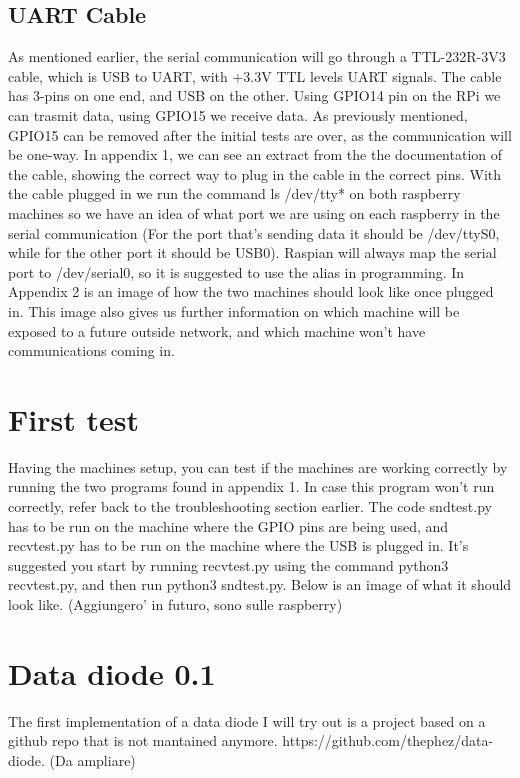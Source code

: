 \documentclass[a4paper,11pt]{scrartcl}
\begin{document}
\subsection{UART Cable}
As mentioned earlier, the serial communication will go through a TTL-232R-3V3 cable, which is USB to UART, with +3.3V TTL levels UART signals. The cable has 3-pins on one end, and USB on the other. Using GPIO14 pin on the RPi we can trasmit data, using GPIO15 we receive data. As previously mentioned, GPIO15 can be removed after the initial tests are over, as the communication will be one-way. In appendix 1, we can see an extract from the the documentation of the cable, showing the correct way to plug in the cable in the correct pins. With the cable plugged in we run the command ls /dev/tty* on both raspberry machines so we have an idea of what port we are using on each raspberry in the serial communication (For the port that's sending data it should be /dev/ttyS0, while for the other port it should be USB0). Raspian will always map the serial port to /dev/serial0, so it is suggested to use the alias in programming. In Appendix 2 is an image of how the two machines should look like once plugged in. This image also gives us further information on which machine will be exposed to a future outside network, and which machine won't have communications coming in.

\section{First test}
Having the machines setup, you can test if the machines are working correctly by running the two programs found in appendix 1. In case this program won't run correctly, refer back to the troubleshooting section earlier. The code sndtest.py has to be run on the machine where the GPIO pins are being used, and recvtest.py has to be run on the machine where the USB is plugged in. It's suggested you start by running recvtest.py using the command python3 recvtest.py, and then run python3 sndtest.py. Below is an image of what it should look like. (Aggiungero' in futuro, sono sulle raspberry)

\section{Data diode 0.1}
The first implementation of a data diode I will try out is a project based on a github repo that is not mantained anymore. https://github.com/thephez/data-diode. (Da ampliare)
\end{document}

